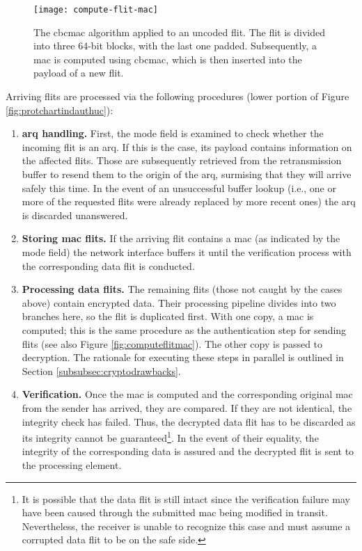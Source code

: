 \begin{figure}
    \centering
    \texttt{[image: compute-flit-mac]}
    \caption[CBC-MAC algorithm applied to an uncoded flit]{The \gls{cbcmac} algorithm applied to an uncoded flit. The flit is divided into three
    64-bit blocks, with the last one padded. Subsequently, a \gls{mac} is computed using \gls{cbcmac}, which is then inserted into the payload of a
    new flit.}
    \label{fig:computeflitmac}
\end{figure}

Arriving flits are processed via the following procedures (lower portion of Figure \ref{fig:protchartindauthuc}):
\begin{enumerate}
    \item \textbf{\Gls{arq} handling.} First, the mode field is examined to check whether the incoming flit is an \gls{arq}. If this is the case, its
        payload contains information on the affected flits. Those are subsequently retrieved from the retransmission buffer to resend them to the
        origin of the \gls{arq}, surmising that they will arrive safely this time. In the event of an unsuccessful buffer lookup (i.e., one or more of
        the requested flits were already replaced by more recent ones) the \gls{arq} is discarded unanswered.
    \item \textbf{Storing \gls{mac} flits.} If the arriving flit contains a \gls{mac} (as indicated by the mode field) the network interface buffers
        it until the verification process with the corresponding data flit is conducted.
    \item \textbf{Processing data flits.} The remaining flits (those not caught by the cases above) contain encrypted data. Their processing pipeline
        divides into two branches here, so the flit is duplicated first. With one copy, a \gls{mac} is computed; this is the same procedure as the
        authentication step for sending flits (see also Figure \vref{fig:computeflitmac}). The other copy is passed to decryption. The rationale for
        executing these steps in parallel is outlined in Section \ref{subsubsec:cryptodrawbacks}.
    \item \textbf{Verification.} Once the \gls{mac} is computed and the corresponding original \gls{mac} from the sender has arrived, they are
        compared. If they are not identical, the integrity check has failed. Thus, the decrypted data flit has to be discarded as its integrity
        cannot be guaranteed\footnote{It is possible that the data flit is still intact since the verification failure may have been caused through
        the submitted \gls{mac} being modified in transit. Nevertheless, the receiver is unable to recognize this case and must assume a corrupted
        data flit to be on the safe side.}. In the event of their equality, the integrity of the corresponding data is assured and the decrypted flit
        is sent to the processing element.
\end{enumerate}
\vspace{0.5\baselineskip}

